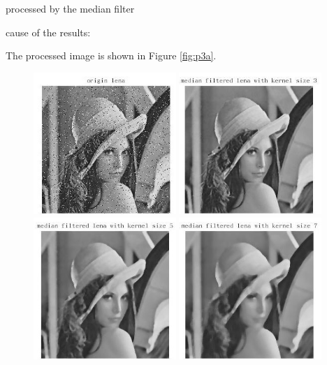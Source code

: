 \problem{}
processed by the median filter



cause of the results:



The processed image is shown in Figure \ref{fig:p3a}.







\begin{figure}[htbp]
    \centering
	\includegraphics[width=0.48\textwidth]{../images/p3/p3a_noisy.jpg}
	\includegraphics[width=0.48\textwidth]{../images/p3/p3a_3x3.jpg}
	\includegraphics[width=0.48\textwidth]{../images/p3/p3a_5x5.jpg}
	\includegraphics[width=0.48\textwidth]{../images/p3/p3a_7x7.jpg}

\end{figure}
